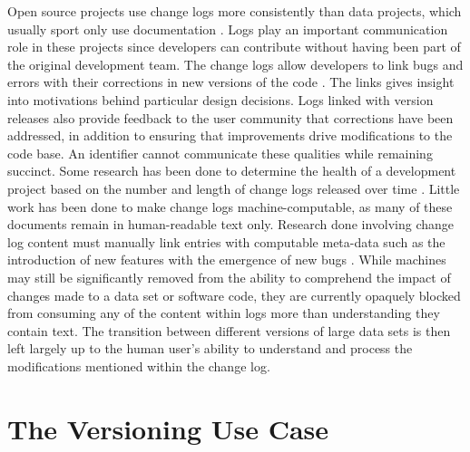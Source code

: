 Open source projects use change logs more consistently than data projects, which usually sport only use documentation \cite{German03automatingthe}.
Logs play an important communication role in these projects since developers can contribute without having been part of the original development team.
The change logs allow developers to link bugs and errors with their corrections in new versions of the code \cite{Chen:2004:OCL:990374.990391}.
The links gives insight into motivations behind particular design decisions.
Logs linked with version releases also provide feedback to the user community that corrections have been addressed, in addition to ensuring that improvements drive modifications to the code base.
An identifier cannot communicate these qualities while remaining succinct.
Some research has been done to determine the health of a development project based on the number and length of change logs released over time \cite{German03automatingthe}.
Little work has been done to make change logs machine-computable, as many of these documents remain in human-readable text only.
Research done involving change log content must manually link entries with computable meta-data such as the introduction of new features with the emergence of new bugs \cite{6132954}.
While machines may still be significantly removed from the ability to comprehend the impact of changes made to a data set or software code, they are currently opaquely blocked from consuming any of the content within logs more than understanding they contain text.
The transition between different versions of large data sets is then left largely up to the human user's ability to understand and process the modifications mentioned within the change log.

\section{The Versioning Use Case} \label{sec:usecase}

